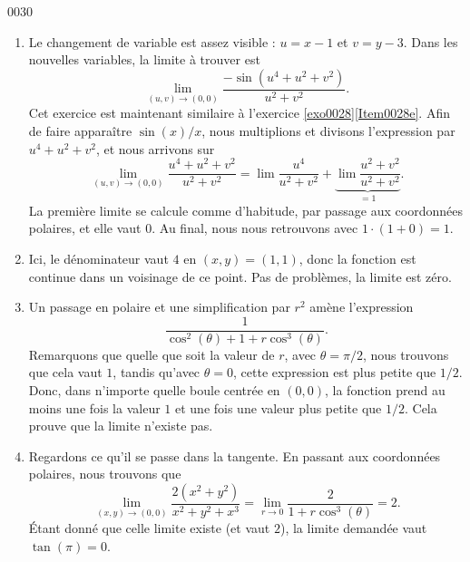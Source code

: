 
\begin{corrige}{0030}

\begin{enumerate}
\item
Le changement de variable est assez visible : $u=x-1$ et $v=y-3$. Dans les nouvelles variables, la limite à trouver est
\begin{equation}
	\lim_{(u,v)\to(0,0)}\frac{ -\sin(u^4+u^2+v^2) }{ u^2+v^2 }.
\end{equation}
Cet exercice est maintenant similaire à l'exercice \ref{exo0028}\ref{Item0028e}. Afin de faire apparaître $\sin(x)/x$, nous multiplions et divisons l'expression par $u^4+u^2+v^2$, et nous arrivons sur
\begin{equation}
	\lim_{(u,v)\to(0,0)}\frac{ u^4+u^2+v^2 }{ u^2+v^2 }=\lim\frac{ u^4 }{ u^2+v^2 }+\underbrace{\lim\frac{ u^2+v^2 }{ u^2+v^2 }}_{=1}.
\end{equation}
La première limite se calcule comme d'habitude, par passage aux coordonnées polaires, et elle vaut $0$. Au final, nous nous retrouvons avec $1\cdot(1+0)=1$.

\item
Ici, le dénominateur vaut $4$ en $(x,y)=(1,1)$, donc la fonction est continue dans un voisinage de ce point. Pas de problèmes, la limite est zéro.

\item
Un passage en polaire et une simplification par $r^2$ amène l'expression
\begin{equation}
	\frac{1}{ \cos^2(\theta)+1+r\cos^3(\theta) }.
\end{equation}
Remarquons que quelle que soit la valeur de $r$, avec $\theta=\pi/2$, nous trouvons que cela vaut $1$, tandis qu'avec $\theta=0$, cette expression est plus petite que $1/2$. Donc, dans n'importe quelle boule centrée en $(0,0)$, la fonction prend au moins une fois la valeur $1$ et une fois une valeur plus petite que $1/2$. Cela prouve que la limite n'existe pas.

\item
Regardons ce qu'il se passe dans la tangente. En passant aux coordonnées polaires, nous trouvons que
\begin{equation}
	\lim_{(x,y)\to(0,0)}\frac{ 2(x^2+y^2) }{ x^2+y^2+x^3 }=\lim_{r\to 0}\frac{ 2 }{ 1+r\cos^3(\theta) }=2.
\end{equation}
Étant donné que celle limite existe (et vaut $2$), la limite demandée vaut $\tan(\pi)=0$.

\end{enumerate}

\end{corrige}
